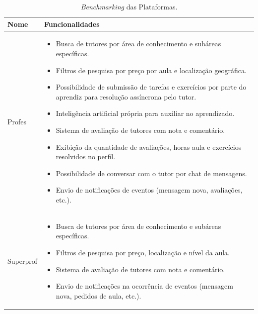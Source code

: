 \begin{table}[h!]
    \centering
    \caption{\textit{Benchmarking} das Plataformas.} %
    \label{tab:benchmarking}
    
    \begin{tabularx}{\linewidth}{|l|X|}
        \hline
        \textbf{Nome} & \textbf{Funcionalidades} \\
        \hline
        Profes & 
        \begin{itemize}[nosep, leftmargin=*, after=\vspace{\baselineskip}]
            \item Busca de tutores por área de conhecimento e subáreas específicas.
            \item Filtros de pesquisa por preço por aula e localização geográfica.
            \item Possibilidade de submissão de tarefas e exercícios por parte do aprendiz para resolução assíncrona pelo tutor.
            \item Inteligência artificial própria para auxiliar no aprendizado.
            \item Sistema de avaliação de tutores com nota e comentário.
            \item Exibição da quantidade de avaliações, horas aula e exercícios resolvidos no perfil.
            \item Possibilidade de conversar com o tutor por chat de mensagens.
            \item Envio de notificações de eventos (mensagem nova, avaliações, etc.).
        \end{itemize}  
        \\
        \hline
        Superprof & 
        \begin{itemize}[nosep, leftmargin=*, after=\vspace{\baselineskip}]
            \item Busca de tutores por área de conhecimento e subáreas específicas.
            \item Filtros de pesquisa por preço, localização e nível da aula.
            \item Sistema de avaliação de tutores com nota e comentário.
            \item Envio de notificações na ocorrência de eventos (mensagem nova, pedidos de aula, etc.).
        \end{itemize}

\end{tabularx}
\end{table}
